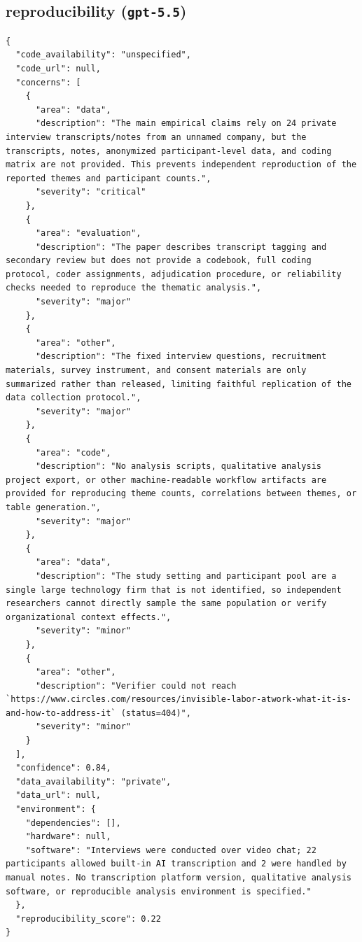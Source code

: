\documentclass[11pt]{article}
\begin{document}
\subsection*{reproducibility (\texttt{gpt-5.5})}
\begin{verbatim}
{
  "code_availability": "unspecified",
  "code_url": null,
  "concerns": [
    {
      "area": "data",
      "description": "The main empirical claims rely on 24 private interview transcripts/notes from an unnamed company, but the transcripts, notes, anonymized participant-level data, and coding matrix are not provided. This prevents independent reproduction of the reported themes and participant counts.",
      "severity": "critical"
    },
    {
      "area": "evaluation",
      "description": "The paper describes transcript tagging and secondary review but does not provide a codebook, full coding protocol, coder assignments, adjudication procedure, or reliability checks needed to reproduce the thematic analysis.",
      "severity": "major"
    },
    {
      "area": "other",
      "description": "The fixed interview questions, recruitment materials, survey instrument, and consent materials are only summarized rather than released, limiting faithful replication of the data collection protocol.",
      "severity": "major"
    },
    {
      "area": "code",
      "description": "No analysis scripts, qualitative analysis project export, or other machine-readable workflow artifacts are provided for reproducing theme counts, correlations between themes, or table generation.",
      "severity": "major"
    },
    {
      "area": "data",
      "description": "The study setting and participant pool are a single large technology firm that is not identified, so independent researchers cannot directly sample the same population or verify organizational context effects.",
      "severity": "minor"
    },
    {
      "area": "other",
      "description": "Verifier could not reach `https://www.circles.com/resources/invisible-labor-atwork-what-it-is-and-how-to-address-it` (status=404)",
      "severity": "minor"
    }
  ],
  "confidence": 0.84,
  "data_availability": "private",
  "data_url": null,
  "environment": {
    "dependencies": [],
    "hardware": null,
    "software": "Interviews were conducted over video chat; 22 participants allowed built-in AI transcription and 2 were handled by manual notes. No transcription platform version, qualitative analysis software, or reproducible analysis environment is specified."
  },
  "reproducibility_score": 0.22
}
\end{verbatim}
\end{document}
